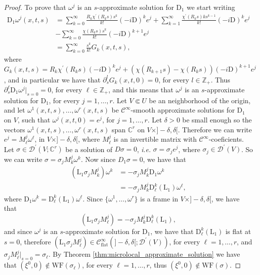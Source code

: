 \documentclass[10pt,a4paper]{amsart}
\begin{document}
\begin{proof}
{	To prove that ${\omega}^j$ is an $s$-approximate solution for $\mathrm{D}_1$ we start writing
	\begin{align*}
		\mathrm{D}_1 {\omega}^j(x,t,s) &= \sum_{k=0}^\infty \frac{ R_k \chi^\prime (R_k s)s^{k}}{k!}(-i\mathrm{D})^k e^j + \sum_{k=1}^\infty \frac{\chi^\prime(R_k s)k s^{k-1}}{k!} (-i\mathrm{D})^k e^j \\
		& - \sum_{k=0}^\infty \frac{\chi(R_k s) s^k}{k!}(-i\mathrm{D})^{k+1} e^j \\
		& = \sum_{k=0}^\infty \frac{s^k}{k!}G_k(x,t,s),
	\end{align*}
	where $G_k(x,t,s) = R_k \chi^\prime(R_k s)(-i\mathrm{D})^k e^j + (\chi(R_{k+1} s) - \chi(R_k s))(-i\mathrm{D})^{k+1} e^j$, and in particular we have that $\partial_s^l G_k(x,t,0) = 0$, for every $l \in \mathbb{Z}_+$. Thus $\partial_s^\ell \mathrm{D}_1 {\omega}^j\big|_{s=0} = 0$, for every $\ell \in \mathbb{Z}_+$, and this means that ${\omega}^j$ is an $s$-approximate solution for $\mathrm{D}_1$, for every $j =1, \dots,r$.
	}
Let $V \Subset U$ be an neighborhood of the origin, and let ${\omega}^1(x,t,s), \dots, {\omega}^r(x,t,s)$ be $\mathcal{C}^\infty$-smooth approximate solutions for $\mathrm{D}_1$ on $V$, such that $\omega^j(x,t,0) = e^j$, for $j = 1, \dots, r$. Let $\delta>0$ be small enough so 
the vectors  ${\omega}^1(x,t,s), \dots, {\omega}^r(x,t,s)$ span $\mathbb{C}^r$ on $V \times ]-\delta , \delta[$. Therefore we can write $e^j = M_\ell^j \omega^\ell $, in $V \times]-\delta,\delta[$, where $M_\ell^j$ is an invertible matrix with $\mathcal{C}^\infty$-coeficients. Let $\sigma \in \mathcal{D}^\prime(V;\mathbb{C}^r)$ be a solution of $D\sigma =0$, \textit{i.e.} $\sigma = \sigma_j e^j$, where $\sigma_j \in \mathcal{D}^\prime(V)$. So we can write $\sigma = \sigma_j M_k^j \omega^k$. Now since $D_1\sigma = 0$, we have that
%
\begin{align*}
	(\mathrm{L}_1 \sigma_j M_k^j) \omega^k & = -  \sigma_j M_k^j \mathrm{D}_1 \omega^k\\
	& = - \sigma_j M_k^j \mathrm{D}_\ell^k(\mathrm{L}_1) \omega^\ell,
\end{align*}
%
where $\mathrm{D}_1 \omega^k =  \mathrm{D}_\ell^k(\mathrm{L}_1) \omega^\ell$. Since $\{\omega^1, \dots, \omega^r\}$ is a frame in $V\times]-\delta,\delta[$, we have that
%
\begin{equation*}
	(\mathrm{L}_1 \sigma_j M_\ell^j) = -  \sigma_j M_k^j \mathrm{D}_\ell^k(\mathrm{L}_1),
\end{equation*}
%
and since $\omega^j$ is an $s$-approximate solution for $\mathrm{D}_1$, we have that $\mathrm{D}_\ell^k(\mathrm{L}_1)$ is flat at $s=0$, therefore $(\mathrm{L}_1 \sigma_j M_\ell^j) \in \mathcal{C}_\text{flat}^\infty(]-\delta, \delta[; \mathcal{D}^\prime(V))$, for every $\ell = 1, \dots,r$, and $\sigma_j M_\ell^j\big|_{s=0} = \sigma_\ell$. By Theorem \ref{thm:microlocal_approximate_solution} we have that $(\xi^0,0) \notin \mathrm{WF}(\sigma_\ell)$, for every $\ell=1,\dots,r$, thus $(\xi^0,0) \notin \mathrm{WF}(\sigma)$.		 
\end{proof}
\end{document}
